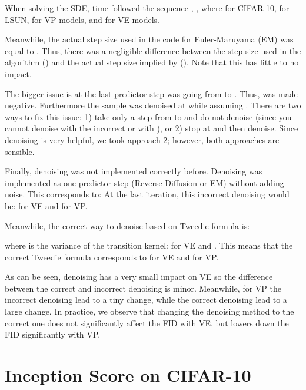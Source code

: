 \documentclass{article}
\begin{document}
When solving the SDE, time followed the sequence , , where  for CIFAR-10,  for LSUN,  for VP models, and  for VE models.

Meanwhile, the actual step size  used in the code for Euler-Maruyama (EM) was equal to . Thus, there was a negligible difference between the step size used in the algorithm () and the actual step size implied by  (). Note that this has little to no impact.

The bigger issue is at the last predictor step was going from  to . Thus,  was made negative. Furthermore the sample was denoised at  while assuming . There are two ways to fix this issue: 1) take only a step from  to  and do not denoise (since you cannot denoise with the incorrect  or with ), or 2) stop at  and then denoise. Since denoising is very helpful, we took approach 2; however, both approaches are sensible.

Finally, denoising was not implemented correctly before. Denoising was implemented as one predictor step (Reverse-Diffusion or EM) without adding noise. This corresponds to: 
At the last iteration, this incorrect denoising would be:
 for VE and 
 for VP.

Meanwhile, the correct way to denoise based on Tweedie formula \citep{efron2011tweedie} is:

where  is the variance of the transition kernel:  for VE and .
This means that the correct Tweedie formula corresponds to
 for VE and  for VP.

As can be seen, denoising has a very small impact on VE so the difference between the correct and incorrect denoising is minor. Meanwhile, for VP the incorrect denoising lead to a tiny change, while the correct denoising lead to a large change. In practice, we observe that changing the denoising method to the correct one does not significantly affect the FID with VE, but lowers down the FID significantly with VP.

\clearpage









\section{Inception Score on CIFAR-10}\label{sec:inception}
\end{document}

